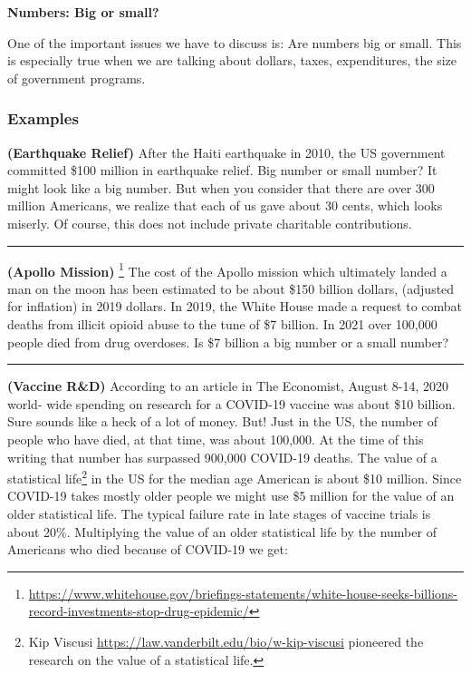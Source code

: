 \documentclass[
]{book}
\begin{document}
\textbf{Numbers: Big or small?}

One of the important issues we have to discuss is: Are numbers big or small. This is especially true when we are talking about dollars, taxes, expenditures, the size of government programs.

\hypertarget{examples}{%
\subsubsection{Examples}\label{examples}}

\textbf{(Earthquake Relief)} After the Haiti earthquake in 2010, the US government committed \$100 million in earthquake relief. Big number or small number? It might look like a big number. But when you consider that there are over 300 million Americans, we realize that each of us gave about 30 cents, which looks miserly. Of course, this does not include private charitable contributions.

\begin{center}\rule{0.5\linewidth}{0.5pt}\end{center}

\textbf{(Apollo Mission)} \footnote{\url{https://www.whitehouse.gov/briefings-statements/white-house-seeks-billions-record-investments-stop-drug-epidemic/}} The cost of the Apollo mission which ultimately landed a man on the moon has been estimated to be about \$150 billion dollars, (adjusted for inflation) in 2019 dollars. In 2019, the White House made a request to combat deaths from illicit opioid abuse to the tune of \$7 billion. In 2021 over 100,000 people died from drug overdoses. Is \$7 billion a big number or a small number?

\begin{center}\rule{0.5\linewidth}{0.5pt}\end{center}

\textbf{(Vaccine R\&D)} According to an article in The Economist, August 8-14, 2020 world- wide spending on research for a COVID-19 vaccine was about \$10 billion. Sure sounds like a heck of a lot of money. But! Just in the US, the number of people who have died, at that time, was about 100,000. At the time of this writing that number has surpassed 900,000 COVID-19 deaths. The value of a statistical life\footnote{Kip Viscusi \url{https://law.vanderbilt.edu/bio/w-kip-viscusi} pioneered the research on the value of a statistical life.} in the US for the median age American is about \$10 million. Since COVID-19 takes mostly older people we might use \$5 million for the value of an older statistical life. The typical failure rate in late stages of vaccine trials is about 20\%. Multiplying the value of an older statistical life by the number of Americans who died because of COVID-19 we get:
\end{document}
